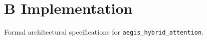 \section{B Implementation}

Formal architectural specifications for \texttt{aegis_hybrid_attention}.
